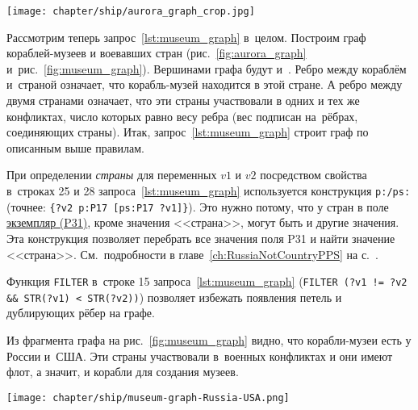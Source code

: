 \newpage
%
\begin{marginfigure}
  \texttt{[image: chapter/ship/aurora\_graph\_crop.jpg]}
  \caption{Граф свойств крейсера <<Аврора>>, 2021 год}%
  \label{fig:aurora_graph}%
\end{marginfigure}

Рассмотрим теперь запрос~\ref{lst:museum_graph} в~целом. 
Построим граф кораблей-музеев и воевавших стран 
(рис.~\ref{fig:aurora_graph} и~рис.~\ref{fig:museum_graph}). 
Вершинами графа будут  
                    и~. 
Ребро между кораблём и~страной означает, что корабль-музей находится в этой стране. 
А ребро между двумя странами означает, 
что эти страны участвовали в одних и тех же конфликтах, число которых равно весу ребра 
(вес подписан на~рёбрах, соединяющих страны). 
Итак, запрос~\ref{lst:museum_graph} строит граф по описанным выше правилам. 

    При определении \emph{страны} для переменных $v1$ и $v2$ 
    посредством свойства  
    в~строках 25 и 28 запроса~\ref{lst:museum_graph} 
    используется конструкция \texttt{p:/ps:} (точнее: \texttt{\{?v2 p:P17 [ps:P17 ?v1]\}}). 
    Это нужно потому, что у стран в поле 
    \href{https://www.wikidata.org/wiki/Property:P31}{экземпляр (P31)}, 
    кроме значения <<страна>>, могут быть и другие значения. 
    Эта конструкция позволяет перебрать все значения поля P31 и найти значение <<страна>>.
    См.~подробности в главе~\ref{ch:RussiaNotCountryPPS} на с.~\pageref{ch:RussiaNotCountryPPS}.

    Функция \lstinline|FILTER|
    в~строке 15 запроса~\ref{lst:museum_graph} 
    \mbox{(\lstinline|FILTER (?v1 != ?v2 && STR(?v1) < STR(?v2))|)} 
    позволяет избежать появления петель и дублирующих рёбер на графе.

Из фрагмента графа на рис.~\ref{fig:museum_graph} видно, 
что корабли-музеи есть у России и~США. 
Эти страны участвовали в~военных конфликтах и они имеют флот, 
а значит, и корабли для создания музеев.


\begin{figure*}[h!]
  \texttt{[image: chapter/ship/museum-graph-Russia-USA.png]}
  \caption[Граф стран и кораблей-музеев, 2021 год.]
          {Фрагмент графа стран, участвовавших в войнах, и~кораблей-музеев России и США, 2021 год}%
  \label{fig:museum_graph}%
\end{figure*}

